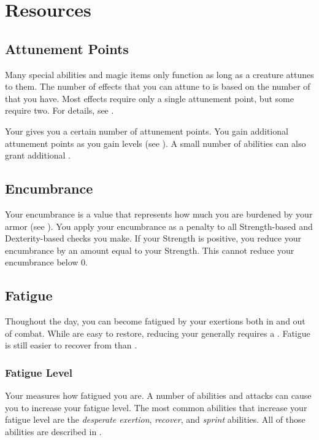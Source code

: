 \section{Resources}\label{Resources}

    \subsection{Attunement Points}\label{Attunement Points}
        Many special abilities and magic items only function as long as a creature attunes to them.
        The number of effects that you can attune to is based on the number of  that you have.
        Most effects require only a single attunement point, but some require two.
        For details, see .

        Your  gives you a certain number of attunement points.
        You gain additional attunement points as you gain levels (see ).
        A small number of abilities can also grant additional .

    \subsection{Encumbrance}\label{Encumbrance}
        Your encumbrance is a value that represents how much you are burdened by your armor (see ).
        You apply your encumbrance as a penalty to all Strength-based and Dexterity-based checks you make.
        If your Strength is positive, you reduce your encumbrance by an amount equal to your Strength.
        This cannot reduce your encumbrance below 0.

    \subsection{Fatigue}\label{Fatigue}
        Thoughout the day, you can become fatigued by your exertions both in and out of combat.
        While  are easy to restore, reducing your  generally requires a .
        Fatigue is still easier to recover from than .

        \subsubsection{Fatigue Level}\label{Fatigue Level}
            Your  measures how fatigued you are.
            A number of abilities and attacks can cause you to increase your fatigue level.
            The most common abilities that increase your fatigue level are the \textit{desperate exertion}, \textit{recover}, and \textit{sprint} abilities.
            All of those abilities are described in .

